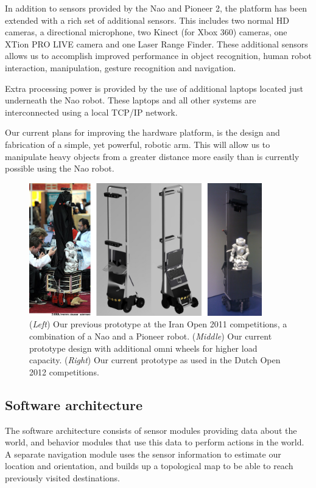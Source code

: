 \documentclass[runningheads,a4paper]{llncs}
\begin{document}
In addition to sensors provided by the Nao and Pioneer 2, the platform has been extended with a rich set of additional sensors.
This includes two normal HD cameras, a directional microphone, two Kinect (for Xbox 360) cameras, one XTion PRO LIVE camera and one Laser Range Finder.
These additional sensors allows us to accomplish improved performance in object recognition, human robot interaction, manipulation, gesture recognition and navigation.

Extra processing power is provided by the use of additional laptops located just underneath the Nao robot.
These laptops and all other systems are interconnected using a local TCP/IP network.

Our current plans for improving the hardware platform, is the design and fabrication of a simple, yet powerful, robotic arm. 
This will allow us to manipulate heavy objects from a greater distance more easily than is currently possible using the Nao robot.

\begin{figure}
\centering
\includegraphics[width=0.9\textwidth]{figures/robot.png}
\caption{(\emph{Left}) Our previous prototype at the Iran Open 2011 competitions, a combination of a Nao and a Pioneer robot. (\emph{Middle}) Our current prototype design with additional omni wheels for higher load capacity. (\emph{Right}) Our current prototype as used in the Dutch Open 2012 competitions.}
\label{fig:prototype}
\end{figure}

\subsection{Software architecture}

The software architecture consists of sensor modules providing data about the world, and behavior modules that use this data to perform actions in the world. 
A separate navigation module uses the sensor information to estimate our location and orientation, and builds up a topological map to be able to reach 
previously visited destinations. 
\end{document}
